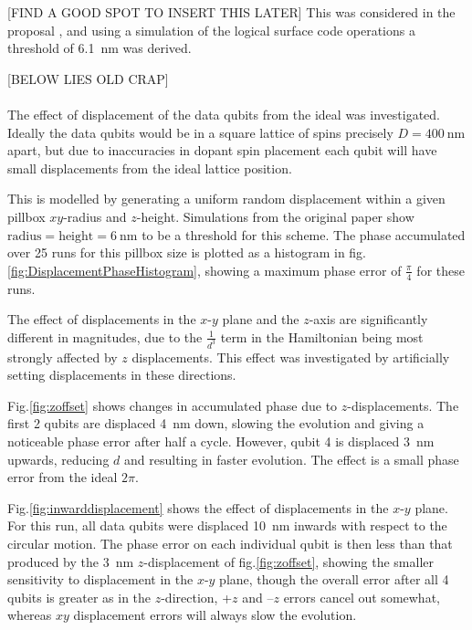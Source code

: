 [FIND A GOOD SPOT TO INSERT THIS LATER] This was considered in the proposal \cite{OGorman2016}, and using a simulation of the logical surface code operations a threshold of \SI{6.1}{\nano\metre} was derived.

[BELOW LIES OLD CRAP]\\
\\ 

The effect of displacement of the data qubits from the ideal was investigated. Ideally the data qubits would be in a square lattice of spins precisely $D = \SI{400}{\nano\metre}$ apart, but due to inaccuracies in dopant spin placement each qubit will have small displacements from the ideal lattice position.

This is modelled by generating a uniform random displacement within a given pillbox $xy$-radius and $z$-height. Simulations from the original paper show $\textrm{radius} = \textrm{height} = \SI{6}{\nano\metre}$ to be a threshold for this scheme. The phase accumulated over 25 runs for this pillbox size is plotted as a histogram in fig.\@ \ref{fig:DisplacementPhaseHistogram}, showing a maximum phase error of $\tfrac{\pi}{4}$ for these runs. 



The effect of displacements in the $x$-$y$ plane and the $z$-axis are significantly different in magnitudes, due to the $\tfrac{1}{d^3}$ term in the Hamiltonian being most strongly affected by $z$ displacements. This effect was investigated by artificially setting displacements in these directions.

Fig.\@ \ref{fig:zoffset} shows changes in accumulated phase due to $z$-displacements. The first 2 qubits are displaced \SI{4}{\nano\metre} down, slowing the evolution and giving a noticeable phase error after half a cycle. However, qubit 4 is displaced \SI{3}{\nano\metre} upwards, reducing $d$ and resulting in faster evolution. The effect is a small phase error from the ideal $2\pi$.

Fig.\@ \ref{fig:inwarddisplacement} shows the effect of displacements in the $x$-$y$ plane. For this run, all data qubits were displaced \SI{10}{\nano\metre} inwards with respect to the circular motion. The phase error on each individual qubit is then less than that produced by the \SI{3}{\nano\metre} $z$-displacement of fig.\@ \ref{fig:zoffset}, showing the smaller sensitivity to displacement in the $x$-$y$ plane, though the overall error after all 4 qubits is greater as in the $z$-direction, +$z$ and --$z$ errors cancel out somewhat, whereas $xy$ displacement errors will always slow the evolution.


